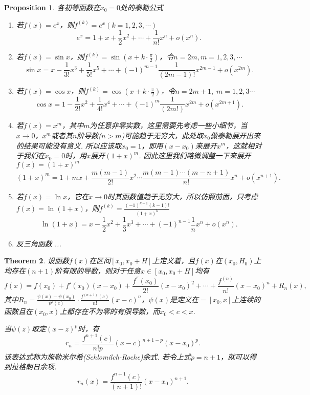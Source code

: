 \documentclass{article}
\newtheorem{theorem}{Theorem}[section]
\newtheorem{proposition}[theorem]{Proposition}
\begin{document}
\begin{proposition}
\rm {\color{red}各初等函数在$x_0 = 0$处的泰勒公式}
\begin{enumerate}
	\item 若$f(x) = e^x$，则$f^{(k)} = e^x(k=1,2,3,\cdots)$
	$$
	e^x = 1 + x + \frac{1}{2}x^2 + \cdots + \frac{1}{n!}x^n + o(x^n). 
	$$
	\item 若$f(x) = \sin x$，则$f^{(k)} = \sin (x+ k\cdot \frac{\pi}{2})$，令$n=2m, m = 1,2,3,\cdots$
	$$
	\sin x = x - \frac{1}{3!}x^3 + \frac{1}{5!}x^5 + \cdots + (-1)^{m-1}\frac{1}{(2m-1)!}x^{2m-1}+o(x^{2m}).
	$$
	\item 若$f(x) = \cos x$，则$f^{(k)} = \cos (x+k\cdot \frac{\pi}{2})$，令$n=2m+1,\; m = 1,2,3\cdots$
	$$
	\cos x = 1 - \frac{1}{2!}x^2 + \frac{1}{4!}x^4 + \cdots + (-1)^{m} \frac{1}{(2m!)}x^{2m} + o(x^{2m+1}).
	$$
	\item 若$f(x)=x^m$，其中$m$为任意非零实数，这里需要先考虑一些小细节，当$x \rightarrow 0$，$x^m$或者其$n$阶导数($n > m$)可能趋于无穷大，此处取$x_0$做泰勒展开出来的结果可能没有意义. 所以应该取$x_0 = 1$，即用$(x-x_0)$来展开$x^m$，这就相对于我们在$x_0 = 0$时，用$x$展开$(1+x)^m$. 因此这里我们略微调整一下来展开$f(x) = (1+x)^m$
	$$
	(1+x)^m = 1 + mx + \frac{m(m-1)}{2!}x^2 \cdots \frac{m(m-1)\cdots(m-n+1)}{n!}x^n + o(x^{n+1}).
	$$
	\item 若$f(x) = \ln x$，它在$x \rightarrow 0$时其函数值趋于无穷大，所以仿照前面，只考虑$f(x) = \ln (1+x)$，则$f^{(k)} = \frac{(-1)^{k-1}(k-1)!}{(1+x)^k}$
	$$
	\ln (1+x) = x - \frac{1}{2} x^2 + \frac{1}{3}x^3 +\cdots + (-1)^{n-1}\frac{1}{n}x^n + o(x^{n}).
	$$
	\item 反三角函数 ...
\end{enumerate}
\end{proposition}


\begin{theorem}
\rm 设函数$f(x)$在区间$[x_0, x_0 + H]$上定义着，且$f(x)$在$(x_0,H_0)$上均存在$(n+1)$阶有限的导数，则对于任意$x \in [x_0,x_0+H]$均有
$$
f(x) = f(x_0) + f'(x_0)(x-x_0) + \frac{f^{''}(x_0)}{2!}(x-x_0)^2 + \cdots + \frac{f^{(n)}}{n!}(x-x_0)^n + R_n(x),
$$
其中$R_n = \frac{\psi(x) -\psi(x_0)}{\psi'(c)}\cdot \frac{f^{(n+1)}(c)}{n!}(x-c)^n$，$\psi(x)$是定义在$=[x_0,x]$上连续的函数且在$(x_0,x)$上都存在不为零的有限导数，而$x_0 < c < x$. 

当$\psi(z)$取定$(x-z)^p$时，有
$$
r_n = \frac{f^{n+1}(c)}{n!p}(x-c)^{n+1-p}(x-x_0)^p.
$$
该表达式称为{\color{red}施勒米尔希(Schlomilch-Roche)余式}. 若令上式$p=n+1$，就可以得到{\color{red}拉格朗日余项}.
$$
r_n(x) = \frac{f^{n+1}(c)}{(n+1)!}(x-x_0)^{n+1}.
$$
\end{theorem}
\end{document}
